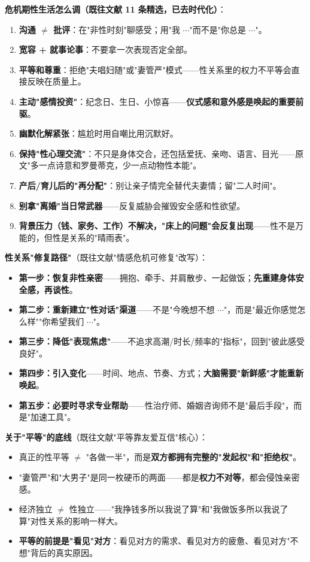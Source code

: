 \documentclass[12pt,UTF8,openany]{ctexbook}
\begin{document}
\textbf{危机期性生活怎么调（既往文献 11 条精选，已去时代化）}：

\begin{enumerate}[leftmargin=2em,itemsep=0.3em]
  \item \textbf{沟通 $\ne$ 批评}：在"非性时刻"聊感受；用"我 $\cdots$"而不是"你总是 $\cdots$"。
  \item \textbf{宽容 + 就事论事}：不要拿一次表现否定全部。
  \item \textbf{平等和尊重}：拒绝"夫唱妇随"或"妻管严"模式——性关系里的权力不平等会直接反映在质量上。
  \item \textbf{主动"感情投资"}：纪念日、生日、小惊喜——\textbf{仪式感和意外感是唤起的重要前驱}。
  \item \textbf{幽默化解紧张}：尴尬时用自嘲比用沉默好。
  \item \textbf{保持"性心理交流"}：不只是身体交合，还包括爱抚、亲吻、语言、目光——原文"多一点诗意和罗曼蒂克，少一点动物性本能"。
  \item \textbf{产后/育儿后的"再分配"}：别让亲子情完全替代夫妻情；留"二人时间"。
  \item \textbf{别拿"离婚"当日常武器}——反复威胁会摧毁安全感和性欲望。
  \item \textbf{背景压力（钱、家务、工作）不解决，"床上的问题"会反复出现}——性不是万能的，但性是关系的"晴雨表"。
\end{enumerate}

\textbf{性关系"修复路径"}（既往文献"情感危机可修复"改写）：

\begin{itemize}[leftmargin=2em,itemsep=0.3em]
  \item \textbf{第一步：恢复非性亲密}——拥抱、牵手、并肩散步、一起做饭；\textbf{先重建身体安全感，再谈性}。
  \item \textbf{第二步：重新建立"性对话"渠道}——不是"今晚想不想 $\cdots$"，而是"最近你感觉怎么样""你希望我们 $\cdots$"。
  \item \textbf{第三步：降低"表现焦虑"}——不追求高潮/时长/频率的"指标"，回到"彼此感受良好"。
  \item \textbf{第四步：引入变化}——时间、地点、节奏、方式；\textbf{大脑需要"新鲜感"才能重新唤起}。
  \item \textbf{第五步：必要时寻求专业帮助}——性治疗师、婚姻咨询师不是"最后手段"，而是"加速工具"。
\end{itemize}

\textbf{关于"平等"的底线}（既往文献"平等靠友爱互信"核心）：

\begin{itemize}[leftmargin=2em,itemsep=0.3em]
  \item 真正的性平等 $\ne$ "各做一半"，而是\textbf{双方都拥有完整的"发起权"和"拒绝权"}。
  \item "妻管严"和"大男子"是同一枚硬币的两面——都是\textbf{权力不对等}，都会侵蚀亲密感。
  \item 经济独立 $\ne$ 性独立——"我挣钱多所以我说了算"和"我做饭多所以我说了算"对性关系的影响一样大。
  \item \textbf{平等的前提是"看见"对方}：看见对方的需求、看见对方的疲惫、看见对方"不想"背后的真实原因。
\end{itemize}
\end{document}
